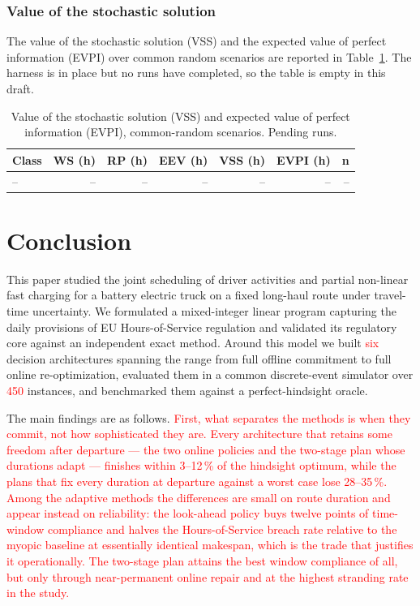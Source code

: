 \documentclass[preprint,12pt,3p]{elsarticle}
\newcommand{\red}[1]{\textcolor{red}{#1}}
\newcommand{\blue}[1]{{\color{darkblue}#1}}
\begin{document}
\subsubsection{Value of the stochastic solution}
\label{sec:vss}

\blue{The value of the stochastic solution (VSS) and the expected value of
perfect information (EVPI) over common random scenarios are reported in
Table~\ref{tab:vss}. The harness is in place but no runs have completed, so the
table is empty in this draft.}

\begin{table}[ht]\centering
\caption{\blue{Value of the stochastic solution (VSS) and expected value of perfect information (EVPI), common-random scenarios. Pending runs.}}
\label{tab:vss}
\begin{tabular}{lrrrrrr}
\hline
Class & WS (h) & RP (h) & EEV (h) & VSS (h) & EVPI (h) & n \\
\hline
\blue{--} & \blue{--} & \blue{--} & \blue{--} & \blue{--} & \blue{--} & \blue{--} \\
\hline
\end{tabular}
\end{table}


\section{Conclusion} \label{section:conclusion}

This paper studied the joint scheduling of driver activities and partial non-linear fast charging for a battery electric truck on a fixed long-haul route under travel-time uncertainty. We formulated a mixed-integer linear program capturing the daily provisions of EU Hours-of-Service regulation and validated its regulatory core against an independent exact method. Around this model we built \red{six} decision architectures spanning the range from full offline commitment to full online re-optimization, evaluated them in a common discrete-event simulator over \red{450} instances, and benchmarked them against a perfect-hindsight oracle.

The main findings are as follows. \red{First, what separates the methods is when
they commit, not how sophisticated they are. Every architecture that retains
some freedom after departure --- the two online policies and the two-stage plan
whose durations adapt --- finishes within 3--12\,\% of the hindsight optimum,
while the plans that fix every duration at departure against a worst case lose
28--35\,\%. Among the adaptive methods the differences are small on route
duration and appear instead on reliability: the look-ahead policy buys twelve
points of time-window compliance and halves the Hours-of-Service breach rate
relative to the myopic baseline at essentially identical makespan, which is the
trade that justifies it operationally. The two-stage plan attains the best
window compliance of all, but only through near-permanent online repair and at
the highest stranding rate in the study.}
\end{document}
